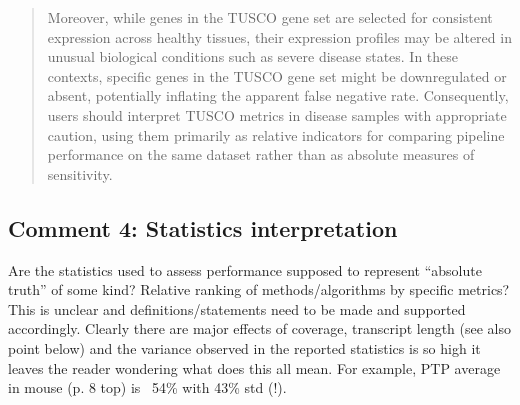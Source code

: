 \documentclass[11pt]{article}
\newcommand{\tuscoGeneSet}{TUSCO gene set}
\newcommand{\tuscoMetrics}{TUSCO metrics}
\begin{document}
\begin{responseboxnew}
\begin{quote}
Moreover, while genes in the \tuscoGeneSet{} are selected for consistent expression across healthy tissues, their expression profiles may be altered in unusual biological conditions such as severe disease states. In these contexts, specific genes in the \tuscoGeneSet{} might be downregulated or absent, potentially inflating the apparent false negative rate. Consequently, users should interpret \tuscoMetrics{} in disease samples with appropriate caution, using them primarily as relative indicators for comparing pipeline performance on the same dataset rather than as absolute measures of sensitivity.
\end{quote}
\end{responseboxnew}

\subsection{Comment 4: Statistics interpretation}

\begin{reviewercomment}
Are the statistics used to assess performance supposed to represent ``absolute truth'' of some kind? Relative ranking of methods/algorithms by specific metrics? This is unclear and definitions/statements need to be made and supported accordingly. Clearly there are major effects of coverage, transcript length (see also point below) and the variance observed in the reported statistics is so high it leaves the reader wondering what does this all mean. For example, PTP average in mouse (p. 8 top) is ~54\% with 43\% std (!).
\end{reviewercomment}
\end{document}

